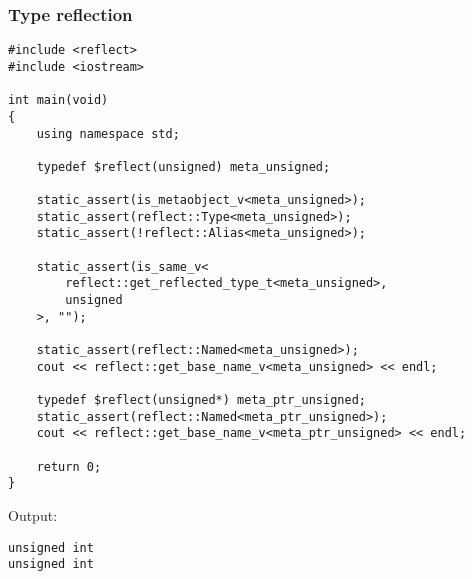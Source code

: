 \subsubsection{Type reflection}

\begin{verbatim}
#include <reflect>
#include <iostream>

int main(void)
{
	using namespace std;

	typedef $reflect(unsigned) meta_unsigned;

	static_assert(is_metaobject_v<meta_unsigned>);
	static_assert(reflect::Type<meta_unsigned>);
	static_assert(!reflect::Alias<meta_unsigned>);

	static_assert(is_same_v<
		reflect::get_reflected_type_t<meta_unsigned>,
		unsigned
	>, "");

	static_assert(reflect::Named<meta_unsigned>);
	cout << reflect::get_base_name_v<meta_unsigned> << endl;

	typedef $reflect(unsigned*) meta_ptr_unsigned;
	static_assert(reflect::Named<meta_ptr_unsigned>);
	cout << reflect::get_base_name_v<meta_ptr_unsigned> << endl;

	return 0;
}
\end{verbatim}

Output:

\begin{verbatim}
unsigned int
unsigned int
\end{verbatim}

